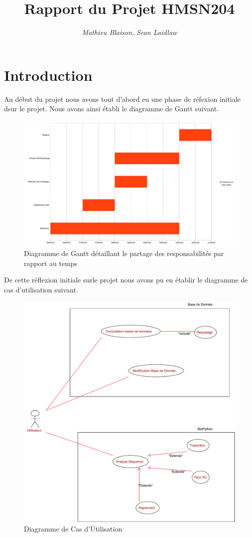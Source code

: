 \documentclass[11pt,french,]{article}
\title{Rapport du Projet HMSN204}
\author{\emph{Mathieu Blaison, Sean Laidlaw}}
\date{}
\begin{document}
\maketitle

\hypertarget{introduction}{%
\section{Introduction}\label{introduction}}

Au début du projet nous avons tout d'abord eu une phase de réfexion
initiale dsur le projet. Nous avons ainsi établi le diagramme de Gantt
suivant.

\begin{figure}[h]
 \centering
 \includegraphics{../img/Gantt.pdf}
 \caption{Diagramme de Gantt détaillant le partage des responsabilités par rapport au temps}
\end{figure}

De cette réflexion initiale surle projet nous avons pu en établir le
diagramme de cas d'utilisation suivant.

\begin{figure}[H]
 \centering
 \includegraphics{../img/Cas_utilisation.pdf}
 \caption{Diagramme de Cas d'Utilisation}
\end{figure}
\end{document}
